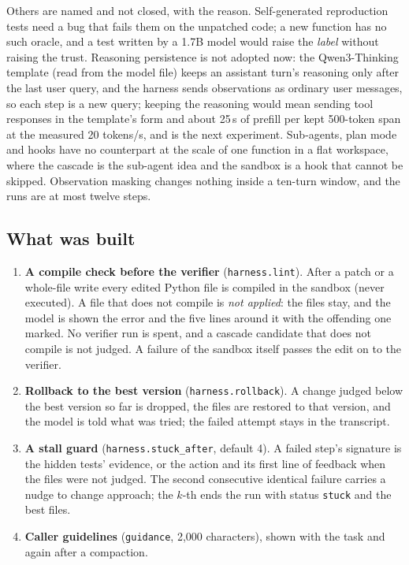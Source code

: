 Others are named and not closed, with the reason. Self-generated reproduction tests need a bug that fails them on the unpatched code; a new
function has no such oracle, and a test written by a 1.7B model would raise the \emph{label} without raising the trust. Reasoning persistence
is not adopted now: the Qwen3-Thinking template (read from the model file) keeps an assistant turn's reasoning only after the last user
query, and the harness sends observations as ordinary user messages, so each step is a new query; keeping the reasoning would mean sending
tool responses in the template's form and about 25\,s of prefill per kept 500-token span at the measured 20 tokens/s, and is the next
experiment. Sub-agents, plan mode and hooks have no counterpart at the scale of one function in a flat workspace, where the cascade is the
sub-agent idea and the sandbox is a hook that cannot be skipped. Observation masking changes nothing inside a ten-turn window, and the runs
are at most twelve steps.

\subsection{What was built}

\begin{enumerate}
  \item \textbf{A compile check before the verifier} (\texttt{harness.lint}). After a patch or a whole-file write every edited Python file is
    compiled in the sandbox (never executed). A file that does not compile is \emph{not applied}: the files stay, and the model is shown the
    error and the five lines around it with the offending one marked. No verifier run is spent, and a cascade candidate that does not
    compile is not judged. A failure of the sandbox itself passes the edit on to the verifier.
  \item \textbf{Rollback to the best version} (\texttt{harness.rollback}). A change judged below the best version so far is dropped, the
    files are restored to that version, and the model is told what was tried; the failed attempt stays in the transcript.
  \item \textbf{A stall guard} (\texttt{harness.stuck\_after}, default 4). A failed step's signature is the hidden tests' evidence, or the
    action and its first line of feedback when the files were not judged. The second consecutive identical failure carries a nudge to change
    approach; the $k$-th ends the run with status \texttt{stuck} and the best files.
  \item \textbf{Caller guidelines} (\texttt{guidance}, 2,000 characters), shown with the task and again after a compaction.
\end{enumerate}


